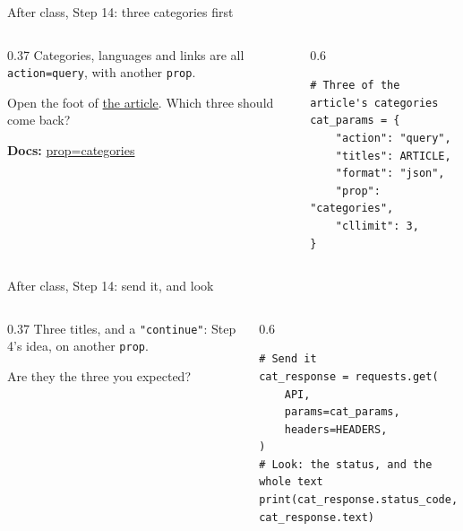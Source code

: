 \documentclass[9pt,aspectratio=169]{beamer}
\begin{document}
\begin{frame}[fragile]{After class, Step 14: three categories first}
    \begin{columns}[T]
        \begin{column}{0.37\textwidth}
            Categories, languages and links are all \texttt{action=query}, with another \texttt{prop}.

            \medskip
            Open the foot of \href{https://en.wikipedia.org/wiki/University_of_Colorado_Boulder}{the article}. Which three should come back?

            \medskip
            {\scriptsize\textbf{Docs:} \href{https://www.mediawiki.org/wiki/API:Categories}{prop=categories}\par}
        \end{column}
        \begin{column}{0.6\textwidth}
\begin{lstlisting}
# Three of the article's categories
cat_params = {
    "action": "query",
    "titles": ARTICLE,
    "format": "json",
    "prop": "categories",
    "cllimit": 3,
}
\end{lstlisting}
        \end{column}
    \end{columns}
\end{frame}

\begin{frame}[fragile]{After class, Step 14: send it, and look}
    \begin{columns}[T]
        \begin{column}{0.37\textwidth}
            Three titles, and a \texttt{"continue"}: Step 4's idea, on another \texttt{prop}.

            \medskip
            Are they the three you expected?
        \end{column}
        \begin{column}{0.6\textwidth}
\begin{lstlisting}
# Send it
cat_response = requests.get(
    API,
    params=cat_params,
    headers=HEADERS,
)
# Look: the status, and the whole text
print(cat_response.status_code, cat_response.text)
\end{lstlisting}
        \end{column}
    \end{columns}
\end{frame}
\end{document}
